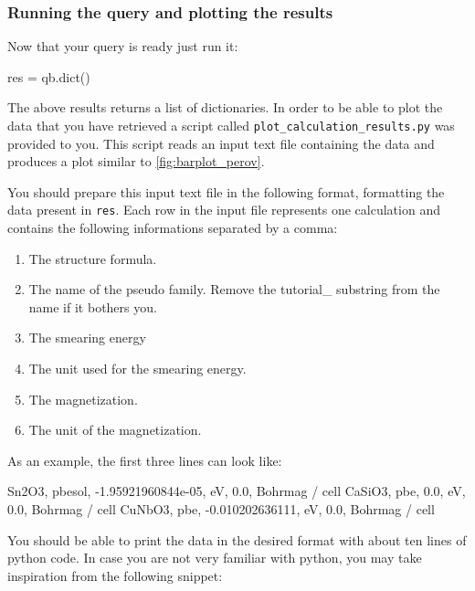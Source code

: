 \subsubsection*{Running the query and plotting the results}

Now that your query is ready just run it:
\begin{pythoncommand}
 res = qb.dict()
\end{pythoncommand}
The above results returns a list of dictionaries.
In order to be able to plot the data that you have retrieved a script called \texttt{plot\_calculation\_results.py}
was provided to you. This script reads an input text file containing the data and produces a plot similar to \autoref{fig:barplot_perov}.

You should prepare this input text file in the following format,
formatting the data present in \texttt{res}.
Each row in the input file represents one calculation and contains the following informations separated by a comma:

\begin{enumerate}
\item The structure formula.
\item The name of the pseudo family. Remove the tutorial\_ substring from the name if it bothers you.
\item The smearing energy
\item The unit used for the smearing energy.
\item The magnetization.
\item The unit of the magnetization.
\end{enumerate}

As an example, the first three lines can look like:
\begin{bashcommand}
Sn2O3,  pbesol, -1.95921960844e-05,  eV,  0.0,  Bohrmag / cell
CaSiO3,    pbe,                0.0,  eV,  0.0,  Bohrmag / cell
CuNbO3,    pbe,    -0.010202636111,  eV,  0.0,  Bohrmag / cell
\end{bashcommand}



\iffalse
You should be able to print the data in the desired format with about ten lines of python code. In case you are not very familiar with python, you may take inspiration from the following snippet:

